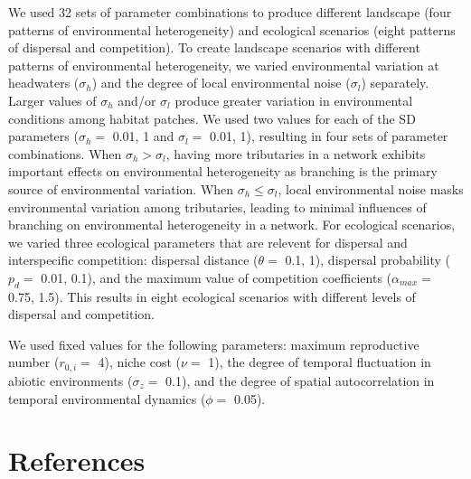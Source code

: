 \documentclass[
]{article}
\begin{document}
We used 32 sets of parameter combinations to produce different landscape
(four patterns of environmental heterogeneity) and ecological scenarios
(eight patterns of dispersal and competition). To create landscape
scenarios with different patterns of environmental heterogeneity, we
varied environmental variation at headwaters (\(\sigma_h\)) and the
degree of local environmental noise (\(\sigma_l\)) separately. Larger
values of \(\sigma_h\) and/or \(\sigma_l\) produce greater variation in
environmental conditions among habitat patches. We used two values for
each of the SD parameters (\(\sigma_h =\) 0.01, 1 and \(\sigma_l =\)
0.01, 1), resulting in four sets of parameter combinations. When
\(\sigma_h > \sigma_l\), having more tributaries in a network exhibits
important effects on environmental heterogeneity as branching is the
primary source of environmental variation. When
\(\sigma_h \le \sigma_l\), local environmental noise masks environmental
variation among tributaries, leading to minimal influences of branching
on environmental heterogeneity in a network. For ecological scenarios,
we varied three ecological parameters that are relevent for dispersal
and interspecific competition: dispersal distance (\(\theta =\) 0.1, 1),
dispersal probability (\(p_d =\) 0.01, 0.1), and the maximum value of
competition coefficients (\(\alpha_{max} =\) 0.75, 1.5). This results in
eight ecological scenarios with different levels of dispersal and
competition.

We used fixed values for the following parameters: maximum reproductive
number (\(r_{0,i} =\) 4), niche cost (\(\nu =\) 1), the degree of
temporal fluctuation in abiotic environments (\(\sigma_z =\) 0.1), and
the degree of spatial autocorrelation in temporal environmental dynamics
(\(\phi =\) 0.05).

\hypertarget{references}{%
\section*{References}\label{references}}
\end{document}
